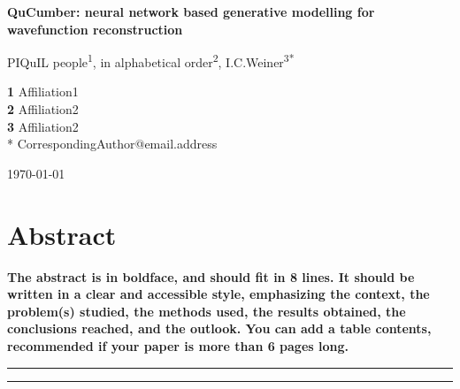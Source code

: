 \documentclass[submission, Phys]{SciPost}
\begin{document}
\begin{center}{\Large \textbf{
QuCumber: neural network based generative modelling for wavefunction reconstruction
}}\end{center}

\begin{center}
PIQuIL people\textsuperscript{1},
in alphabetical order\textsuperscript{2},
I.C.Weiner\textsuperscript{3*}
\end{center}

\begin{center}
{\bf 1} Affiliation1
\\
{\bf 2} Affiliation2
\\
{\bf 3} Affiliation2
\\
* CorrespondingAuthor@email.address
\end{center}

\begin{center}
\today
\end{center}


\section*{Abstract}
{\bf
The abstract is in boldface, and should fit in 8 lines.
It should be written in a clear and accessible style, emphasizing the context, the problem(s) studied, the methods used, the results obtained, the conclusions reached, and the outlook. You can add a table contents, recommended if your paper is more than 6 pages long.
}


\vspace{10pt}
\noindent\rule{\textwidth}{1pt}
\tableofcontents\thispagestyle{fancy}
\noindent\rule{\textwidth}{1pt}
\vspace{10pt}


\end{document}
